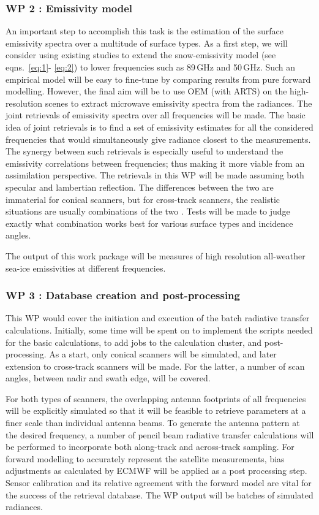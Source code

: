 \documentclass[12pt,oneside,a4paper]{article}
\begin{document}
\subsubsection*{WP 2 : Emissivity model}
%
\label{sec:emissivity}
An important step to accomplish this task is the estimation of the surface emissivity spectra over a multitude of surface types. As a first step, we will consider using existing studies to extend the snow-emissivity model (see eqns.~\ref{eq:1}- \ref{eq:2}) to lower frequencies such as 89\,GHz and 50\,GHz. Such an empirical model will be easy to fine-tune by comparing results from pure forward modelling. However, the final aim will be to use OEM (with ARTS) on the high-resolution scenes to extract microwave emissivity spectra from the radiances. The joint retrievals of emissivity spectra over all frequencies will be made. The basic idea of joint retrievals is to find a set of emissivity estimates for all the considered frequencies that would simultaneously give radiance closest to the measurements. The synergy between such retrievals is especially useful to understand the emissivity correlations between frequencies; thus making it more viable from an assimilation perspective. The retrievals in this WP will be made assuming both specular and lambertian reflection. The differences between the two are immaterial for conical scanners, but for cross-track scanners, the realistic situations are usually combinations of the two \citep{matzler:2005:onthe}. Tests will be made to judge exactly what combination works best for various surface types and incidence angles. 

The output of this work package will be measures of high resolution all-weather sea-ice emissivities at different frequencies. 
	
\subsubsection*{WP 3 : Database creation and post-processing}
%
\label{sec:database}	
This WP would cover the initiation and execution of the batch radiative transfer calculations. Initially, some time will be spent on to implement the scripts needed for the basic calculations, to add jobs to the calculation cluster, and post-processing. As a start, only conical scanners will be simulated, and later extension to cross-track scanners will be made. For the latter, a number of scan angles, between nadir and swath edge, will be covered.

For both types of scanners, the overlapping antenna footprints of all frequencies will be explicitly simulated so that it will be feasible to retrieve parameters at a finer scale than individual antenna beams. To generate the antenna pattern at the desired frequency, a number of pencil beam radiative transfer calculations will be performed to incorporate both along-track and across-track sampling. For forward modelling to accurately represent the satellite measurements, bias adjustments as calculated by ECMWF will be applied as a post processing step. Sensor calibration and its relative agreement with the forward model are vital for the success of the retrieval database. 
The WP output will be batches of simulated radiances.
\end{document}
